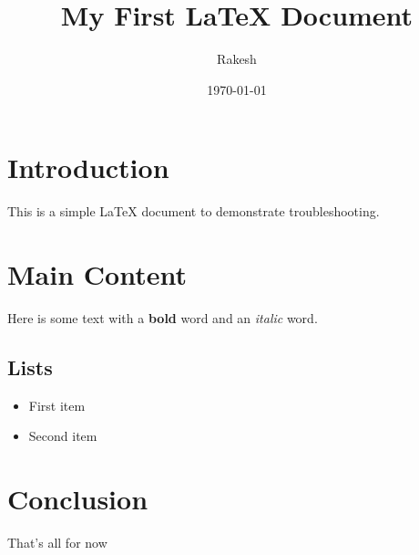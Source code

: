\documentclass{article}
\begin{document}
	\title{My First LaTeX Document}
	\author{Rakesh}
	\date{\today}
	\maketitle
	\section{Introduction}
	This is a simple LaTeX document to demonstrate troubleshooting.
	\section{Main Content}
	Here is some text with a \textbf{bold} word and an \emph{italic} word.
	\subsection{Lists}
	\begin{itemize}
		\item First item
		\item Second item
	\end{itemize}
	\section{Conclusion}
	That’s all for now
\end{document}
